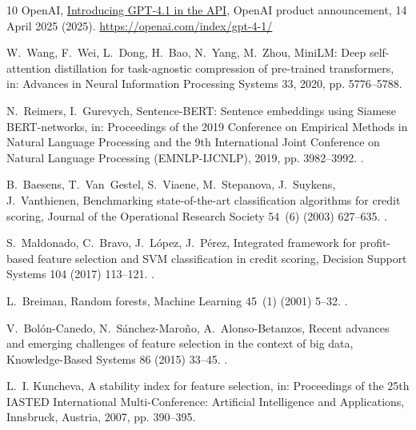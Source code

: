 \documentclass[final,5p,twocolumn]{elsarticle}
\begin{document}
\begin{thebibliography}{10}
{OpenAI}, \href{https://openai.com/index/gpt-4-1/}{Introducing {GPT-4.1} in the
  {API}}, OpenAI product announcement, 14 April 2025 (2025).
\newline\urlprefix\url{https://openai.com/index/gpt-4-1/}

W.~Wang, F.~Wei, L.~Dong, H.~Bao, N.~Yang, M.~Zhou, {MiniLM}: Deep
  self-attention distillation for task-agnostic compression of pre-trained
  transformers, in: Advances in Neural Information Processing Systems 33, 2020,
  pp. 5776--5788.

N.~Reimers, I.~Gurevych, Sentence-{BERT}: Sentence embeddings using {S}iamese
  {BERT}-networks, in: Proceedings of the 2019 Conference on Empirical Methods
  in Natural Language Processing and the 9th International Joint Conference on
  Natural Language Processing (EMNLP-IJCNLP), 2019, pp. 3982--3992.
\newblock \href {https://doi.org/10.18653/v1/D19-1410}
  {}.

B.~Baesens, T.~Van~Gestel, S.~Viaene, M.~Stepanova, J.~Suykens, J.~Vanthienen,
  Benchmarking state-of-the-art classification algorithms for credit scoring,
  Journal of the Operational Research Society 54~(6) (2003) 627--635.
\newblock \href {https://doi.org/10.1057/palgrave.jors.2601545}
  {}.

S.~Maldonado, C.~Bravo, J.~L{\'o}pez, J.~P{\'e}rez, Integrated framework for
  profit-based feature selection and {SVM} classification in credit scoring,
  Decision Support Systems 104 (2017) 113--121.
\newblock \href {https://doi.org/10.1016/j.dss.2017.10.007}
  {}.

L.~Breiman, Random forests, Machine Learning 45~(1) (2001) 5--32.
\newblock \href {https://doi.org/10.1023/A:1010933404324}
  {}.

V.~Bol{\'o}n-Canedo, N.~S{\'a}nchez-Maro{\~n}o, A.~Alonso-Betanzos, Recent
  advances and emerging challenges of feature selection in the context of big
  data, Knowledge-Based Systems 86 (2015) 33--45.
\newblock \href {https://doi.org/10.1016/j.knosys.2015.05.014}
  {}.

L.~I. Kuncheva, A stability index for feature selection, in: Proceedings of the
  25th IASTED International Multi-Conference: Artificial Intelligence and
  Applications, Innsbruck, Austria, 2007, pp. 390--395.


\end{thebibliography}
\end{document}
